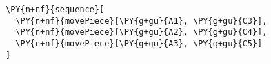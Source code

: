 \begin{Verbatim}[commandchars=\\\{\}]
\PY{n+nf}{sequence}[
  \PY{n+nf}{movePiece}[\PY{g+gu}{A1}, \PY{g+gu}{C3}],
  \PY{n+nf}{movePiece}[\PY{g+gu}{A2}, \PY{g+gu}{C4}],
  \PY{n+nf}{movePiece}[\PY{g+gu}{A3}, \PY{g+gu}{C5}]
]
\end{Verbatim}
